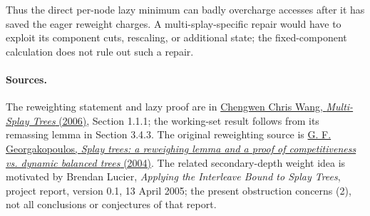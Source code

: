 \documentclass[11pt]{article}
\begin{document}
Thus the direct per-node lazy minimum can badly overcharge accesses
after it has saved the eager reweight charges. A multi-splay-specific
repair would have to exploit its component cuts, rescaling, or additional
state; the fixed-component calculation does not rule out such a repair.

\paragraph{Sources.}
The reweighting statement and lazy proof are in
\href{https://www.csd.cmu.edu/sites/default/files/phd-thesis/CMU-CS-06-140.pdf}
{Chengwen Chris Wang, \emph{Multi-Splay Trees} (2006)},
Section 1.1.1; the working-set result follows from its remassing lemma
in Section 3.4.3. The original reweighting source is
\href{https://doi.org/10.1016/j.jalgor.2003.09.004}
{G. F. Georgakopoulos, \emph{Splay trees: a reweighing lemma and a proof
of competitiveness vs. dynamic balanced trees} (2004)}.
The related secondary-depth weight idea is motivated by Brendan Lucier,
\emph{Applying the Interleave Bound to Splay Trees}, project report,
version 0.1, 13 April 2005; the present obstruction concerns (2), not
all conclusions or conjectures of that report.
\end{document}
